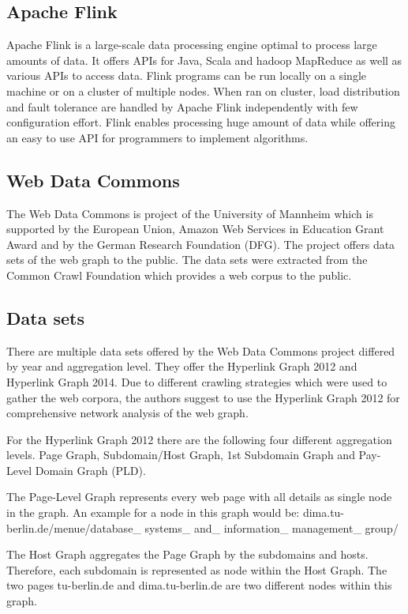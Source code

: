 \subsection{Apache Flink}
Apache Flink is a large-scale data processing engine optimal to process large amounts of data. It offers APIs for Java, Scala and hadoop MapReduce as well as various APIs to access data. Flink programs can be run locally on a single machine or on a cluster of multiple nodes. When ran on cluster, load distribution and fault tolerance are handled by Apache Flink independently with few configuration effort. Flink enables processing huge amount of data while offering an easy to use API for programmers to implement algorithms.

\subsection{Web Data Commons}
The Web Data Commons is project of the University of Mannheim which is supported by the European Union, Amazon Web Services in Education Grant Award and by the German Research Foundation (DFG). The project offers data sets of the web graph to the public. The data sets were extracted from the Common Crawl Foundation which provides a web corpus to the public.

\subsection{Data sets}
There are multiple data sets offered by the Web Data Commons project differed by year and aggregation level. They offer the Hyperlink Graph 2012 and Hyperlink Graph 2014. Due to different crawling strategies which were used to gather the web corpora, the authors suggest to use the Hyperlink Graph 2012 for comprehensive network analysis of the web graph.

For the Hyperlink Graph 2012 there are the following four different aggregation levels. Page Graph, Subdomain/Host Graph, 1st Subdomain Graph and Pay-Level Domain Graph (PLD).

The Page-Level Graph represents every web page with all details as single node in the graph. An example for a node in this graph would be: dima.tu-berlin.de/menue/database\_ systems\_ and\_ information\_ management\_ group/

The Host Graph aggregates the Page Graph by the subdomains and hosts. Therefore, each subdomain is represented as node within the Host Graph. The two pages tu-berlin.de and dima.tu-berlin.de are two different nodes within this graph.

